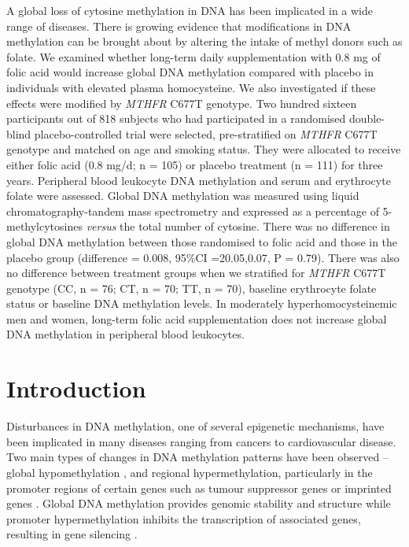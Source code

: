 \noindent A global loss of cytosine methylation in DNA has been implicated in a wide range of diseases. There is growing evidence that modifications in DNA methylation can be brought about by altering the intake of methyl donors such as folate. We examined whether long-term daily supplementation with 0.8 mg of folic acid would increase global DNA methylation compared with placebo in individuals with elevated plasma homocysteine. We also investigated if these effects were modified by \emph{MTHFR} C677T genotype. Two hundred sixteen participants out of 818 subjects who had participated in a randomised double-blind placebo-controlled trial were selected, pre-stratified on \emph{MTHFR} C677T genotype and matched on age and smoking status. They were allocated to receive either folic acid (0.8 mg/d; n = 105) or placebo treatment (n = 111) for three years. Peripheral blood leukocyte DNA methylation and serum and erythrocyte folate were assessed. Global DNA methylation was measured using liquid chromatography-tandem mass spectrometry and expressed as a percentage of 5-methylcytosines \emph{versus} the total number of cytosine. There was no difference in global DNA methylation between those randomised to folic acid and those in the placebo group (difference = 0.008, 95\%CI =20.05,0.07, P = 0.79). There was also no difference between treatment groups when we stratified for \emph{MTHFR} C677T genotype (CC, n = 76; CT, n = 70; TT, n = 70), baseline erythrocyte folate status or baseline DNA methylation levels. In moderately hyperhomocysteinemic men and women, long-term folic acid supplementation does not increase global DNA methylation in peripheral blood leukocytes.

\newpage

\section[]{Introduction} %
\noindent Disturbances in DNA methylation, one of several epigenetic mechanisms, have been implicated in many diseases ranging from cancers to cardiovascular disease. Two main types of changes in DNA methylation patterns have been observed -- global hypomethylation \cite{c41}, and regional hypermethylation, particularly in the promoter regions of certain genes such as tumour suppressor genes or imprinted genes \cite{c42,c43,c44}. Global DNA methylation provides genomic stability and structure \cite{c45} while promoter hypermethylation inhibits the transcription of associated genes, resulting in gene silencing \cite{c46}.

